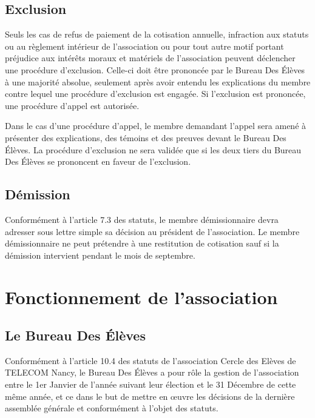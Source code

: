 \documentclass{article} %
\begin{document}
		\subsection{Exclusion}
			
			Seuls les cas de refus de paiement de la cotisation annuelle,
			infraction aux statuts ou au règlement intérieur de l'association ou
			pour tout autre motif portant préjudice aux intérêts moraux et
			matériels de l’association peuvent déclencher une procédure
			d’exclusion. Celle-ci doit être prononcée par le Bureau Des Élèves à
			une majorité absolue, seulement après avoir entendu les explications
			du membre contre lequel une procédure d’exclusion est engagée. Si
			l’exclusion est prononcée, une procédure d’appel est autorisée.

			Dans le cas d’une procédure d’appel, le membre demandant l’appel
			sera amené à présenter des explications, des témoins et des preuves
			devant le Bureau Des Élèves. La procédure d’exclusion ne sera
			validée que si les deux tiers du Bureau Des Élèves se prononcent en
			faveur de l’exclusion.

		\subsection{Démission}

			Conformément à l'article 7.3 des statuts, le membre démissionnaire
			devra adresser sous lettre simple sa décision au président de
			l’association. Le membre démissionnaire ne peut prétendre à une
			restitution de cotisation sauf si la démission intervient pendant le
			mois de septembre.


	\section{Fonctionnement de l’association}

		\subsection{Le Bureau Des Élèves}

			Conformément à l’article 10.4 des statuts de l’association Cercle
			des Elèves de TELECOM Nancy, le Bureau Des Élèves a pour rôle la
			gestion de l'association entre le 1er Janvier de l’année suivant
			leur élection et le 31 Décembre de cette même année, et ce dans le
			but de mettre en œuvre les décisions de la dernière assemblée
			générale et conformément à l'objet des statuts.
\end{document}
